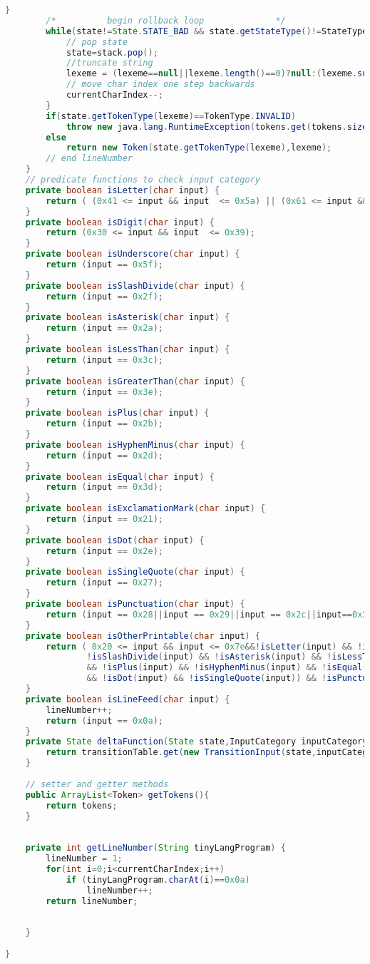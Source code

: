 \begin{lstlisting}[basicstyle=\miniscule,language=Java,caption=Table Driven Lexer,label=listing:tabledrivenlexer]
	        }
        /*          begin rollback loop              */
        while(state!=State.STATE_BAD && state.getStateType()!=StateType.ACCEPTING) {
        	// pop state
        	state=stack.pop();
        	//truncate string
    	    lexeme = (lexeme==null||lexeme.length()==0)?null:(lexeme.substring(0, lexeme.length()-1));   
    	    // move char index one step backwards
    	    currentCharIndex--;
        }
    	if(state.getTokenType(lexeme)==TokenType.INVALID)
    		throw new java.lang.RuntimeException(tokens.get(tokens.size()-1).getLexeme()+tinyLangProgram.charAt(currentCharIndex+1)+" in line "+lineNumber+" not recognised by TinyLang's grammar");    		
    	else 
    		return new Token(state.getTokenType(lexeme),lexeme);
    	// end lineNumber
    }
	// predicate functions to check input category
	private boolean isLetter(char input) {
		return ( (0x41 <= input && input  <= 0x5a) || (0x61 <= input && input <= 0x7a) );
	}
	private boolean isDigit(char input) {
		return (0x30 <= input && input  <= 0x39);
	}	
	private boolean isUnderscore(char input) {
		return (input == 0x5f);
	}
	private boolean isSlashDivide(char input) {
		return (input == 0x2f);
	}
	private boolean isAsterisk(char input) {
		return (input == 0x2a);
	}
	private boolean isLessThan(char input) {
		return (input == 0x3c);
	}
	private boolean isGreaterThan(char input) {
		return (input == 0x3e);
	}
	private boolean isPlus(char input) {
		return (input == 0x2b);
	}
	private boolean isHyphenMinus(char input) {
		return (input == 0x2d);
	}
	private boolean isEqual(char input) {
		return (input == 0x3d);
	}
	private boolean isExclamationMark(char input) {
		return (input == 0x21);
	}
	private boolean isDot(char input) {
		return (input == 0x2e);
	}
	private boolean isSingleQuote(char input) {
		return (input == 0x27);
	}
	private boolean isPunctuation(char input) {
		return (input == 0x28||input == 0x29||input == 0x2c||input==0x3a||input==0x3b||input== 0x7b||input==0x7d);
	}
	private boolean isOtherPrintable(char input) {
		return ( 0x20 <= input && input <= 0x7e&&!isLetter(input) && !isDigit(input) && !isUnderscore(input) &&
				!isSlashDivide(input) && !isAsterisk(input) && !isLessThan(input) && !isGreaterThan(input)
				&& !isPlus(input) && !isHyphenMinus(input) && !isEqual(input) && !isExclamationMark(input)
				&& !isDot(input) && !isSingleQuote(input)) && !isPunctuation(input);
	}
	private boolean isLineFeed(char input) {
		lineNumber++;
		return (input == 0x0a);
	}
	private State deltaFunction(State state,InputCategory inputCategory) {
		return transitionTable.get(new TransitionInput(state,inputCategory));
	}
	
	// setter and getter methods 
	public ArrayList<Token> getTokens(){
		return tokens;
	}
	
	
	private int getLineNumber(String tinyLangProgram) {
		lineNumber = 1;
		for(int i=0;i<currentCharIndex;i++) 
			if (tinyLangProgram.charAt(i)==0x0a)
				lineNumber++;
		return lineNumber;
				
		
	}
		
}
\end{lstlisting}

